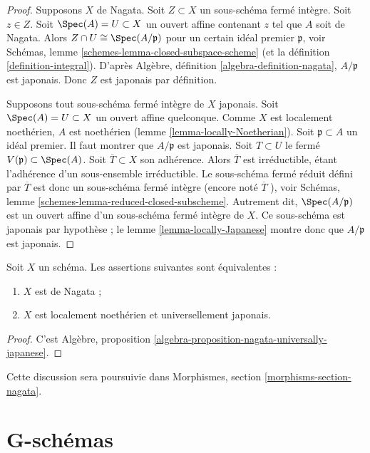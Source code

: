 \begin{proof}
Supposons $X$ de Nagata. Soit $Z \subset X$ un sous-schéma fermé intègre.
Soit $z \in Z$.
Soit $\Spec(A) = U \subset X$ un ouvert affine contenant $z$
tel que $A$ soit de Nagata. Alors
$Z \cap U \cong \Spec(A/\mathfrak p)$ pour un certain idéal premier $\mathfrak p$,
voir Schémas, lemme \ref{schemes-lemma-closed-subspace-scheme} (et
la définition \ref{definition-integral}).
D'après Algèbre, définition \ref{algebra-definition-nagata},
 $A/\mathfrak p$ est japonais. Donc $Z$ est japonais par définition.

\medskip\noindent
Supposons tout sous-schéma fermé intègre de $X$ japonais.
Soit $\Spec(A) = U \subset X$ un ouvert affine quelconque.
Comme $X$ est localement noethérien, $A$ est noethérien
(lemme \ref{lemma-locally-Noetherian}). Soit $\mathfrak p \subset A$
un idéal premier. Il faut montrer que $A/\mathfrak p$ est japonais.
Soit $T \subset U$ le fermé $V(\mathfrak p) \subset \Spec(A)$.
Soit $\overline{T} \subset X$ son adhérence. Alors $\overline{T}$ est
irréductible, étant l'adhérence d'un sous-ensemble irréductible. Le
sous-schéma fermé réduit défini par $\overline{T}$ est donc un sous-schéma
fermé intègre (encore noté $\overline{T}$ ), voir
Schémas, lemme \ref{schemes-lemma-reduced-closed-subscheme}.
Autrement dit, $\Spec(A/\mathfrak p)$ est un ouvert
affine d'un sous-schéma fermé intègre de $X$. Ce sous-schéma est
japonais par hypothèse ; le lemme \ref{lemma-locally-Japanese} montre donc que
$A/\mathfrak p$ est japonais.
\end{proof}

\begin{lemma}
\label{lemma-nagata-universally-Japanese}
Soit $X$ un schéma. Les
assertions suivantes sont équivalentes :
\begin{enumerate}
\item $X$ est de Nagata ;
\item $X$ est localement noethérien et universellement japonais.
\end{enumerate}
\end{lemma}

\begin{proof}
C'est
Algèbre, proposition \ref{algebra-proposition-nagata-universally-japanese}.
\end{proof}

\noindent
Cette discussion sera poursuivie dans
Morphismes, section \ref{morphisms-section-nagata}.



\section{G-schémas}
\label{section-G-scheme}


